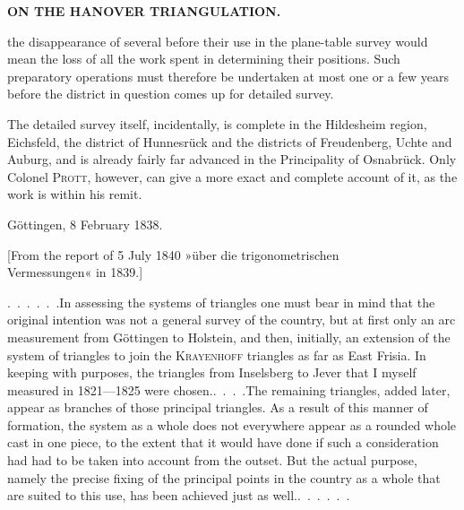 \par\clearpage
\noindent\null\hfill{\small\textbf{ON THE HANOVER TRIANGULATION.}}\hfill{}\par\medskip

\noindent the disappearance of several before their use in the plane-table survey would mean the loss of all the work spent in determining their positions. Such preparatory operations must therefore be undertaken at most one or a few years before the district in question comes up for detailed survey.

\par\noindent\hspace*{\parindent}The detailed survey itself, incidentally, is complete in the Hildesheim region, Eichsfeld, the district of Hunnesrück and the districts of Freudenberg, Uchte and Auburg, and is already fairly far advanced in the Principality of Osnabrück. Only Colonel \textsc{Prott}, however, can give a more exact and complete account of it, as the work is within his remit.

\par\noindent\hspace*{\parindent}Göttingen, 8 February 1838.

\par\medskip
\begin{center}
[From the report of 5 July 1840 »über die trigonometrischen\\
Vermessungen« in 1839.]
\end{center}

\par\noindent\hspace*{\parindent}\mbox{.\ .\ .\ .\ .\ .}\quad In assessing the systems of triangles one must bear in mind that the original intention was not a general survey of the country, but at first only an arc measurement from Göttingen to Holstein, and then, initially, an extension of the system of triangles to join the \textsc{Krayenhoff} triangles as far as East Frisia. In keeping with  purposes, the triangles from Inselsberg to Jever that I myself measured in 1821---1825 were \mbox{chosen.\enspace\mbox{.\ .\ .\ .}}\quad The remaining triangles, added later, appear as branches of those principal triangles. As a result of this manner of formation, the system as a whole does not everywhere appear as a rounded whole cast in one piece, to the extent that it would have done if such a consideration had had to be taken into account from the outset. But the actual purpose, namely the precise fixing of the principal points in the country as a whole that are suited to this use, has been achieved just as \mbox{well.\enspace\mbox{.\ .\ .\ .\ .\ .}}

